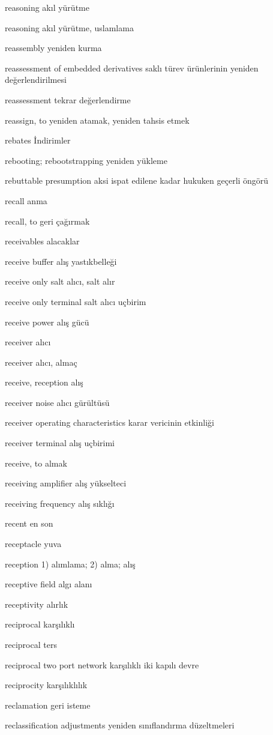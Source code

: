 \documentclass[12pt,fleqn]{article}\usepackage{../../common}
\begin{document}
reasoning akıl yürütme

reasoning akıl yürütme, uslamlama

reassembly yeniden kurma

reassessment of embedded derivatives saklı türev ürünlerinin yeniden değerlendirilmesi

reassessment tekrar değerlendirme

reassign, to yeniden atamak, yeniden tahsis etmek

rebates İndirimler

rebooting; rebootstrapping yeniden yükleme

rebuttable presumption aksi ispat edilene kadar hukuken geçerli öngörü

recall anma

recall, to geri çağırmak

receivables alacaklar

receive buffer alış yastıkbelleği

receive only salt alıcı, salt alır

receive only terminal salt alıcı uçbirim

receive power alış gücü

receiver alıcı

receiver alıcı, almaç

receive, reception alış

receiver noise alıcı gürültüsü

receiver operating characteristics karar vericinin etkinliği

receiver terminal alış uçbirimi

receive, to almak

receiving amplifier alış yükselteci

receiving frequency alış sıklığı

recent en son

receptacle yuva

reception 1) alımlama; 2) alma; alış

receptive field algı alanı

receptivity alırlık

reciprocal karşılıklı

reciprocal ters

reciprocal two port network karşılıklı iki kapılı devre

reciprocity karşılıklılık

reclamation geri isteme

reclassification adjustments yeniden sınıflandırma düzeltmeleri
\end{document}
